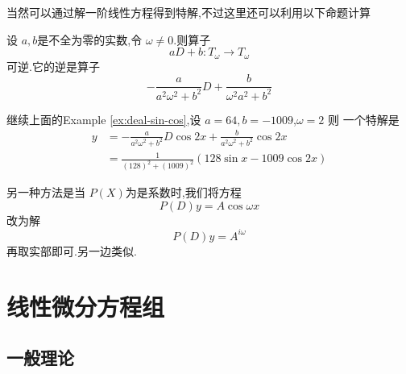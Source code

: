 \documentclass[lang=cn,12pt,color=green,fontset=none]{elegantbook}
\begin{document}
当然可以通过解一阶线性方程得到特解,不过这里还可以利用以下命题计算 

\begin{proposition}
        设 \(  a,b  \)是不全为零的实数,令 \(   \omega \neq 0  \).则算子 \[
        aD+ b:T_{ \omega }\to T_{ \omega }
        \]可逆.它的逆是算子 \[
        - \frac{a }{a^{2} \omega ^{2}+ b^{2} }D+  \frac{b }{ \omega ^{2}a^{2}+ b^{2} }  
        \]  
\end{proposition}

\begin{example}
    继续上面的Example \ref{ex:deal-sin-cos},设 \(  a=64 , b= -1009  \),\(   \omega = 2  \) 则 一个特解是 \[
  \begin{aligned}
    y& =   - \frac{a}{a^{2} \omega ^{2}+ b^{2}}D \cos 2x+  \frac{b}{ a^{2}\omega ^{2}+ b^{2}} \cos 2x\\ 
      & =  \frac{1}{\left( 128 \right)^{2}+ \left( 1009 \right)^{2}  } \left(128\sin x -1009 \cos 2x \right) 
  \end{aligned}
    \]
\end{example}

\hspace*{\fill}

另一种方法是当 \(  P\left( X \right)   \)为是系数时,我们将方程 \[
P\left( D \right)y= A\cos  \omega x 
\] 改为解 \[
P\left( D \right)y =  A^{i \omega } 
\]再取实部即可.另一边类似.

\begin{problemset}
    \item 
\end{problemset}

\chapter{线性微分方程组}


\section{一般理论}
\end{document}
